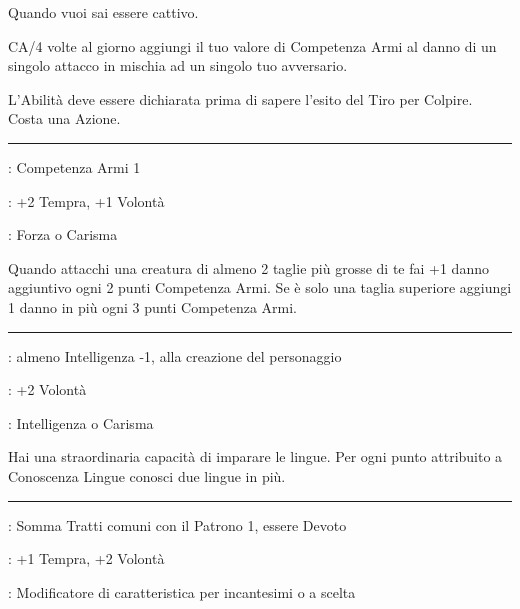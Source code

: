 \begin{multicols}{2}
Quando vuoi sai essere cattivo.

CA/4 volte al giorno aggiungi il tuo valore di Competenza Armi al danno di un singolo attacco in mischia ad un singolo tuo avversario.

L'Abilità deve essere dichiarata prima di sapere l'esito del Tiro per Colpire. Costa una Azione.

\smallskip\noindent\rule{\linewidth}{2pt} \hypertarget{più sono grossi più fanno rumore quando cadono}{}\medskip{}
\noindent
\begin{description}[noitemsep, topsep=0pt, parsep=0pt, partopsep=0pt, leftmargin=0cm, labelwidth=2.5cm]
    \item[\textbf{Requisito}]: Competenza Armi 1
    \item[\textbf{Tiri Salvezza}]: +2 Tempra, +1 Volontà
    \item[\textbf{Caratteristica}]: Forza o Carisma
\end{description}

Quando attacchi una creatura di almeno 2 taglie più grosse di te fai +1 danno aggiuntivo ogni 2 punti Competenza Armi. Se è solo una taglia superiore aggiungi 1 danno in più ogni 3 punti Competenza Armi.

\smallskip\noindent\rule{\linewidth}{2pt} \hypertarget{Poliglotta}{}\medskip{}
\noindent
\begin{description}[noitemsep, topsep=0pt, parsep=0pt, partopsep=0pt, leftmargin=0cm, labelwidth=2.5cm]
    \item[\textbf{Requisito}]: almeno Intelligenza -1, alla creazione del personaggio
    \item[\textbf{Tiri Salvezza}]: +2 Volontà
    \item[\textbf{Caratteristica}]: Intelligenza o Carisma
\end{description}

Hai una straordinaria capacità di imparare le lingue. Per ogni punto attribuito a Conoscenza Lingue conosci due lingue in più.

\smallskip\noindent\rule{\linewidth}{2pt} \hypertarget{Potere del Patrono}{}\medskip{}
\noindent
\begin{description}[noitemsep, topsep=0pt, parsep=0pt, partopsep=0pt, leftmargin=0cm, labelwidth=2.5cm]
    \item[\textbf{Requisito}]: Somma Tratti comuni con il Patrono 1, essere Devoto
    \item[\textbf{Tiri Salvezza}]: +1 Tempra, +2 Volontà
    \item[\textbf{Caratteristica}]: Modificatore di caratteristica per incantesimi o a scelta
\end{description}


\end{multicols}
